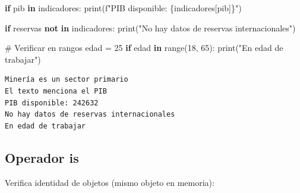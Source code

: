 \documentclass[
  doc,
  floatsintext,
  longtable,
  a4paper,
  nolmodern,
  notxfonts,
  notimes,
  12pt,
  colorlinks=true,linkcolor=blue,citecolor=blue,urlcolor=blue]{apa7}
\newenvironment{Shaded}{\begin{snugshade}}{\end{snugshade}}
\newcommand{\BuiltInTok}[1]{\textcolor[rgb]{0.00,0.23,0.31}{#1}}
\newcommand{\CommentTok}[1]{\textcolor[rgb]{0.37,0.37,0.37}{#1}}
\newcommand{\ControlFlowTok}[1]{\textcolor[rgb]{0.00,0.23,0.31}{\textbf{#1}}}
\newcommand{\DecValTok}[1]{\textcolor[rgb]{0.68,0.00,0.00}{#1}}
\newcommand{\KeywordTok}[1]{\textcolor[rgb]{0.00,0.23,0.31}{\textbf{#1}}}
\newcommand{\NormalTok}[1]{\textcolor[rgb]{0.00,0.23,0.31}{#1}}
\newcommand{\OperatorTok}[1]{\textcolor[rgb]{0.37,0.37,0.37}{#1}}
\newcommand{\SpecialCharTok}[1]{\textcolor[rgb]{0.37,0.37,0.37}{#1}}
\newcommand{\SpecialStringTok}[1]{\textcolor[rgb]{0.13,0.47,0.30}{#1}}
\newcommand{\StringTok}[1]{\textcolor[rgb]{0.13,0.47,0.30}{#1}}
\begin{document}
\begin{Shaded}
\begin{Highlighting}[]
\ControlFlowTok{if} \StringTok{\textquotesingle{}pib\textquotesingle{}} \KeywordTok{in}\NormalTok{ indicadores:}
    \BuiltInTok{print}\NormalTok{(}\SpecialStringTok{f"PIB disponible: }\SpecialCharTok{\{}\NormalTok{indicadores[}\StringTok{\textquotesingle{}pib\textquotesingle{}}\NormalTok{]}\SpecialCharTok{\}}\SpecialStringTok{"}\NormalTok{)}

\ControlFlowTok{if} \StringTok{\textquotesingle{}reservas\textquotesingle{}} \KeywordTok{not} \KeywordTok{in}\NormalTok{ indicadores:}
    \BuiltInTok{print}\NormalTok{(}\StringTok{"No hay datos de reservas internacionales"}\NormalTok{)}

\CommentTok{\# Verificar en rangos}
\NormalTok{edad }\OperatorTok{=} \DecValTok{25}
\ControlFlowTok{if}\NormalTok{ edad }\KeywordTok{in} \BuiltInTok{range}\NormalTok{(}\DecValTok{18}\NormalTok{, }\DecValTok{65}\NormalTok{):}
    \BuiltInTok{print}\NormalTok{(}\StringTok{"En edad de trabajar"}\NormalTok{)}
\end{Highlighting}
\end{Shaded}

\begin{verbatim}
Minería es un sector primario
El texto menciona el PIB
PIB disponible: 242632
No hay datos de reservas internacionales
En edad de trabajar
\end{verbatim}

\subsection{Operador is}\label{operador-is}

Verifica identidad de objetos (mismo objeto en memoria):
\end{document}
